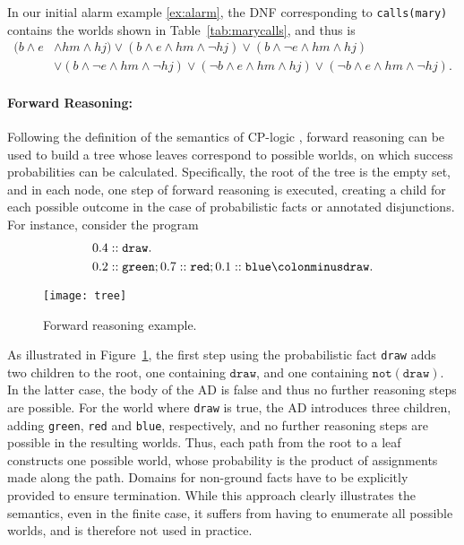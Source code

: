 \documentclass[a4paper]{article}
\begin{document}
In  our initial alarm  example \eqref{ex:alarm}, the DNF
corresponding to 
\verb|calls(mary)| contains the worlds shown in
Table~\ref{tab:marycalls}, and thus  is 
\begin{align}\label{eq:dnf-cm}
(b\wedge e&\wedge hm\wedge hj)\vee (b\wedge
e\wedge hm\wedge\neg hj)
\vee (b\wedge\neg e \wedge hm \wedge hj)\\ &\vee (b\wedge\neg e \wedge
hm\wedge\neg hj) \vee (\neg b\wedge e\wedge hm\wedge hj) \vee
(\neg b\wedge e\wedge hm\wedge\neg hj).\nonumber
\end{align} 


\paragraph{Forward Reasoning:} Following the definition of the semantics of CP-logic
\citep{vennekens:tplp09}, forward reasoning can be used to build a
tree whose leaves correspond to possible worlds, on which
success probabilities can be calculated. Specifically, the root of the
tree is the empty set, and in each node, one step of forward reasoning
is executed, creating a child for each possible outcome in the case of
probabilistic facts or annotated disjunctions. 
For instance, consider the program
\begin{align*}
& 0.4::\mathtt{draw}.\\
& 0.2::\mathtt{green} ; 0.7::\mathtt{red}
 ; 0.1::\mathtt{blue} \colonminus \mathtt{draw}.
\end{align*}
\begin{figure}
\centering
\texttt{[image: tree]}
\caption{Forward reasoning example.}
\label{fig:cptree}
\end{figure}
As illustrated in Figure~\ref{fig:cptree},  the first step
using the probabilistic fact \verb|draw| adds two children to the
root, one containing $\mathtt{draw}$, and
one containing $\mathtt{not(draw)}$.  In the latter case, the body of
the AD is false and thus no further reasoning steps are possible. For
the world where \verb|draw| is true, the AD introduces three children,
adding \verb|green|, \verb|red| and \verb|blue|, respectively, and no
further reasoning steps are possible in the resulting worlds. Thus, each path from the root to a
leaf constructs one possible world, whose probability is the product
of assignments made along the path. Domains for non-ground facts
have to be explicitly provided to ensure termination. 
While this approach clearly
illustrates the semantics, even in the finite case, it suffers from having to
enumerate all possible worlds, and is therefore not used in practice. 
\end{document}

